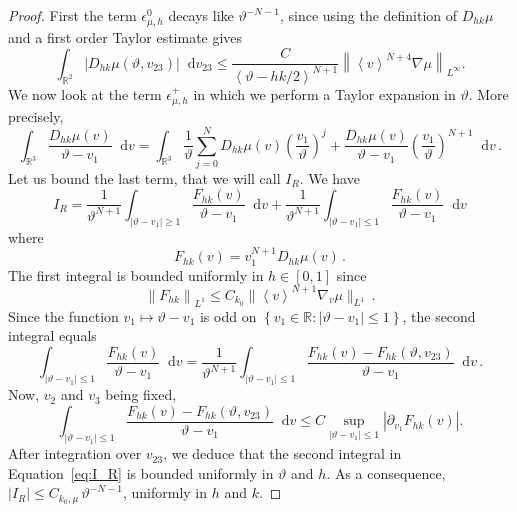 \documentclass[a4paper,12pt]{amsart} %
\theoremstyle{plain}
\theoremstyle{definition}
\newcommand		{\RR}		{\mathbb R}			%
\newcommand		{\R}		{\RR}
\newcommand		{\Rd}		{\R^3}
\newcommand		{\lt}			{\left}				%
\newcommand		{\rt}			{\right}			%
\renewcommand	{\(}			{\lt(}
\renewcommand	{\)}			{\rt)}
\newcommand		{\set}[1]		{\lt\{#1\rt\}}
\newcommand		{\bangle}[1]	{\lt\langle #1\rt\rangle}
\newcommand		{\weight}[1]	{\bangle{#1}}	%
\newcommand		{\n}[1]			{\lt\lvert{#1}\rt\rvert}	%
\newcommand		{\nrm}[1]		{\lt\lVert{#1}\rt\rVert}		%
\newcommand		{\snrm}[1]		{\lVert #1\rVert}
\newcommand		{\Nrm}[2]		{\nrm{#1}_{#2}}
\newcommand		{\sNrm}[2]		{\snrm{#1}_{#2}}
\renewcommand		{\d}		{\mathop{}\!\mathrm{d}}		%
\newcommand			{\Dv}		{\nabla_v}
\newcommand		{\intd}			{\int_{\Rd}}
\newcommand	{\h}			{h}
\begin{document}
\begin{proof}
		First the term $\epsilon_{\mu,\h}^0$ decays like $\vartheta^{-N-1}$, since using the definition of $D_{h k}\mu$ and a first order Taylor estimate gives
		\begin{equation}\label{eq:boundsmall}
			\int_{\R^2} \n{D_{h k} \mu(\vartheta,v_{23})} \d v_{23} \leq \frac{C}{\weight{\vartheta-h k/2}^{N+1}} \Nrm{\weight{v}^{N+4}\nabla\mu}{L^\infty} .
		\end{equation}
		We now look at the term $\epsilon_{\mu,\h}^+$ in which we perform a Taylor expansion in $\vartheta$. More precisely,
		\begin{equation*}
			\intd \frac{D_{h k}\mu(v)}{\vartheta - v_1} \d v = \intd \frac{1}{\vartheta} \sum_{j=0}^N D_{h k}\mu(v) \lt(\frac{v_1}{\vartheta}\rt)^j +\frac{D_{h k}\mu(v)}{\vartheta - v_1} \lt(\frac{v_1}{\vartheta}\rt)^{N+1} \d v \, .
		\end{equation*}
		Let us bound the last term, that we will call $I_R$. We have
		\begin{equation}\label{eq:I_R}
			I_R
			= \frac{1}{\vartheta^{N+1}} \int_{\n{\vartheta - v_1}\ge 1} \frac{F_{h k}(v)}{\vartheta - v_1} \d v + \frac{1}{\vartheta^{N+1}} \int_{\n{\vartheta - v_1} \le 1} \frac{F_{h k}(v)}{\vartheta - v_1} \d v
		\end{equation}
		where
		\begin{equation*}
			F_{h k}(v) = v_1^{N+1} D_{h k} \mu(v) \, .
		\end{equation*}
		The first integral is bounded uniformly in $h\in[0,1]$ since 
		\begin{equation*}
			\Nrm{F_{h k}}{L^1} \leq C_{k_0}\sNrm{\weight{v}^{N+1}\Dv\mu}{L^1}\,.
		\end{equation*}
		Since the function $v_1\mapsto \vartheta-v_1$ is odd on $\set{v_1\in\R:\n{\vartheta-v_1}\leq 1}$, the second integral equals
		\begin{equation*}
			\int_{\n{\vartheta - v_1} \le 1} \frac{F_{h k}(v)}{\vartheta - v_1} \d v = \frac{1}{\vartheta^{N+1}} \int_{\n{\vartheta - v_1} \le 1} \frac{F_{h k}(v) - F_{h k}(\vartheta,v_{23})}{\vartheta - v_1} \d v \, .
		\end{equation*}
		Now, $v_2$ and $v_3$ being fixed,
		\begin{equation*}
			\int_{\n{\vartheta - v_1} \le 1} \frac{F_{h k}(v) - F_{h k}(\vartheta,v_{23})}{\vartheta - v_1} \d v \le C \sup_{\n{\vartheta - v_1} \le 1} \n{\partial_{v_1} F_{h k}(v)} .
		\end{equation*}
		After integration over $v_{23}$, we deduce that the second integral in Equation~\eqref{eq:I_R} is bounded uniformly in $\vartheta$ and $\h$. As a consequence, $\n{I_R} \leq C_{k_0,\mu}\,\vartheta^{-N-1}$, uniformly in $\h$ and $k$.
	

\end{proof}
\end{document}
